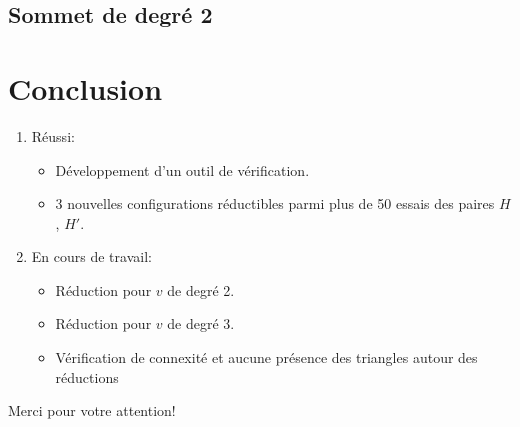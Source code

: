 \documentclass{beamer}
\begin{document}
\subsection{Sommet de degré 2}
\begin{frame}
\end{frame}

\begin{frame}
\end{frame}

\section{Conclusion}
\begin{frame}
\begin{enumerate}
\item Réussi:
\begin{itemize}
\item Développement d'un outil de vérification.
\item 3 nouvelles configurations réductibles parmi plus de 50 essais des paires $H$, $H'$.
\end{itemize}
\item En cours de travail:
\begin{itemize}
\item Réduction pour $v$ de degré 2.
\item Réduction pour $v$ de degré 3.
\item Vérification de connexité et aucune présence des triangles autour des réductions
\end{itemize}
\end{enumerate}

\end{frame}

\begin{frame}
\begin{center}
Merci pour votre attention!
\end{center}
\end{frame}
\end{document}
